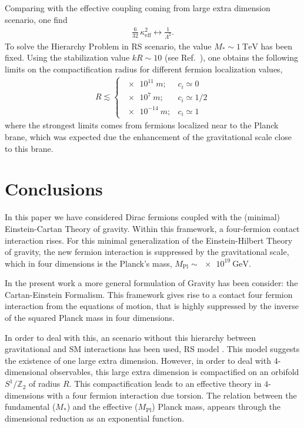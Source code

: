\documentclass[twocolumn,showpacs,showkeys,prd,superscriptaddress]{revtex4-1}
\begin{document}
Comparing with the effective coupling coming from large extra dimension scenario, one find 
\begin{align}
  \frac{6}{32}\,\kappa_{\text{eff}}^2 \longleftrightarrow \frac{1}{\Lambda^2}.
\end{align}
To solve the Hierarchy Problem in RS scenario, the value $M_*\sim\SI{1}{\TeV}$ has been fixed. Using the stabilization value $k R \sim 10$ (see Ref.~\cite{Goldberger:1999uk}), one obtains the following limits on the compactification radius for different fermion localization values,
\begin{align}
  \label{rconst}
  R \lesssim 
  \begin{cases}
    \SI{e11}{m}; & c_i\simeq0 \\
    \SI{e7}{m}; & c_i\simeq1/2 \\
    \SI{e-14}{m}; & c_i\simeq1 
  \end{cases}
\end{align}
where the strongest limits comes from fermions localized near to the Planck brane, which was expected due the enhancement of the gravitational scale close to this brane.


\section{\label{sec:conclusions}Conclusions}

In this paper we have considered Dirac fermions coupled with the (minimal) Einstein-Cartan Theory of gravity. Within this framework, a four-fermion contact interaction rises. For this minimal generalization of the Einstein-Hilbert Theory of gravity, the new fermion interaction is suppressed by the gravitational scale, which in four dimensions is the Planck's mass, $M_{\text{Pl}}\sim\SI{e19}{\GeV}$.


In the present work a more general formulation of Gravity has been consider: the Cartan-Einstein Formalism. This framework gives rise to a contact four fermion interaction from the equations of motion, that is highly suppressed by the inverse of the squared Planck mass in four dimensions. 

In order to deal with this, an scenario without this hierarchy between gravitational and SM interactions has been used, RS model \cite{Randall:1999ee}. This model suggests the existence of one large extra dimension. However, in order to deal with $4$-dimensional observables, this large extra dimension is compactified on an orbifold $S^1/\mathbb{Z}_2$ of radius $R$. This compactification leads to an effective theory in $4$-dimensions with a four fermion interaction due torsion. The relation between the fundamental ($M_*$) and the effective ($M_{\text{Pl}}$) Planck mass, appears through the dimensional reduction as an exponential function.  
\end{document}
